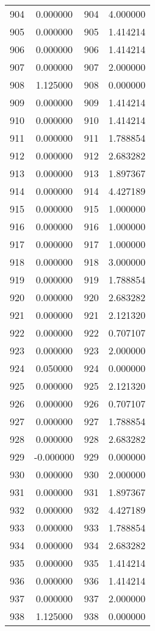 \documentclass[12pt]{article}
\begin{document}
\begin{longtable}{@{}cccc@{}}
904 & 0.000000 & 904 & 4.000000 \\
905 & 0.000000 & 905 & 1.414214 \\
906 & 0.000000 & 906 & 1.414214 \\
907 & 0.000000 & 907 & 2.000000 \\
908 & 1.125000 & 908 & 0.000000 \\
909 & 0.000000 & 909 & 1.414214 \\
910 & 0.000000 & 910 & 1.414214 \\
911 & 0.000000 & 911 & 1.788854 \\
912 & 0.000000 & 912 & 2.683282 \\
913 & 0.000000 & 913 & 1.897367 \\
914 & 0.000000 & 914 & 4.427189 \\
915 & 0.000000 & 915 & 1.000000 \\
916 & 0.000000 & 916 & 1.000000 \\
917 & 0.000000 & 917 & 1.000000 \\
918 & 0.000000 & 918 & 3.000000 \\
919 & 0.000000 & 919 & 1.788854 \\
920 & 0.000000 & 920 & 2.683282 \\
921 & 0.000000 & 921 & 2.121320 \\
922 & 0.000000 & 922 & 0.707107 \\
923 & 0.000000 & 923 & 2.000000 \\
924 & 0.050000 & 924 & 0.000000 \\
925 & 0.000000 & 925 & 2.121320 \\
926 & 0.000000 & 926 & 0.707107 \\
927 & 0.000000 & 927 & 1.788854 \\
928 & 0.000000 & 928 & 2.683282 \\
929 & -0.000000 & 929 & 0.000000 \\
930 & 0.000000 & 930 & 2.000000 \\
931 & 0.000000 & 931 & 1.897367 \\
932 & 0.000000 & 932 & 4.427189 \\
933 & 0.000000 & 933 & 1.788854 \\
934 & 0.000000 & 934 & 2.683282 \\
935 & 0.000000 & 935 & 1.414214 \\
936 & 0.000000 & 936 & 1.414214 \\
937 & 0.000000 & 937 & 2.000000 \\
938 & 1.125000 & 938 & 0.000000 \\

\end{longtable}
\end{document}
